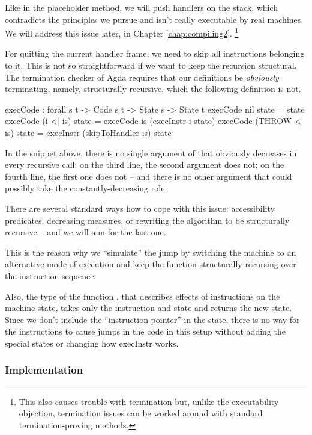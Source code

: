 Like in the placeholder method, we will push handlers on the stack, which
contradicts the principles we pursue and isn't really executable by real
machines. We will address this issue later, in Chapter \ref{chap:compiling2}.%
\footnote{This also causes trouble with termination but, unlike the
executability objection, termination issues can be worked around with
standard termination-proving methods.}

For quitting the current handler frame, we need to skip all instructions
belonging to it. This is not so straightforward if we want to keep the
recursion structural. The termination checker of Agda requires that our
definitions be \emph{obviously} terminating, namely, structurally recursive,
which the following definition is not.
\begin{code}
  execCode : forall {s t} -> Code s t -> State s -> State t
  execCode nil state = state
  execCode (i <| is) state = execCode is (execInstr i state)
  execCode (THROW <| is) state = execInstr (skipToHandler is) state
\end{code}
In the snippet above, there is no single argument of  that
obviously decreases in every recursive call: on the third line, the second
argument does not; on the fourth line, the first one does not -- and there
is no other argument that could possibly take the constantly-decreasing role.

There are several standard ways how to cope with this issue: accessibility
predicates, decreasing measures, or rewriting the algorithm to be
structurally recursive -- and we will aim for the last one.

This is the reason why we ``simulate'' the jump by switching the machine to an
alternative mode of execution and keep the function 
structurally recursing over the instruction sequence.

Also, the type of the function , that describes effects of
instructions on the machine state, takes only the instruction and state and
returns the new state. Since we don't include the ``instruction pointer'' in
the state, there is no way for the instructions to cause jumps in the code in
this setup without adding the special states or changing how execInstr works.


\subsubsection{Implementation}


